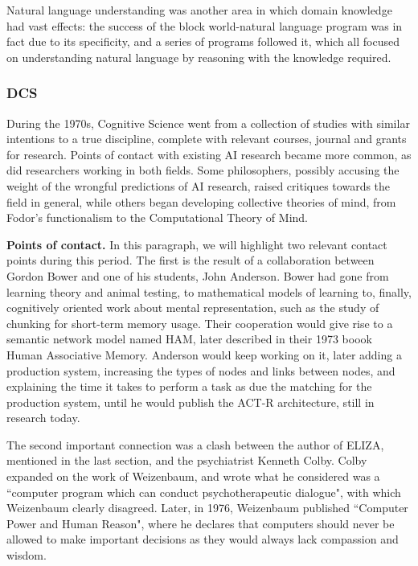 \documentclass[../main.tex]{subfiles}
\begin{document}
Natural language understanding was another area in which domain knowledge had vast effects: the success of the block world-natural language program was in fact due to its specificity, and a series of programs followed it\cite{schankScriptsPlansGoals1977}\cite{wilenskyUnderstandingGoalbasedStories1978}\cite{schankComputerUnderstanding1981}, which all focused on understanding natural language by reasoning with the knowledge required.

\subsubsection{DCS}
During the 1970s, Cognitive Science went from a collection of studies with similar intentions to a true discipline, complete with relevant courses, journal and grants for research. Points of contact with existing AI research became more common, as did researchers working in both fields. Some philosophers, possibly accusing the weight of the wrongful predictions of AI research, raised critiques towards the field in general, while others began developing collective theories of mind, from Fodor's functionalism to the Computational Theory of Mind.

\vspace{4pt}
\textbf{Points of contact.} In this paragraph, we will highlight two relevant contact points during this period. The first is the result of a collaboration between Gordon Bower and one of his students, John Anderson. Bower had gone from learning theory and animal testing, to mathematical models of learning to, finally, cognitively oriented work about mental representation, such as the study of chunking for short-term memory usage\cite{GordonBowerPsycNET}. Their cooperation would give rise to a semantic network model named HAM, later described in their 1973 boook Human Associative Memory\cite{andersonHumanAssociativeMemory1973}. Anderson would keep working on it, later adding a production system, increasing the types of nodes and links between nodes, and explaining the time it takes to perform a task as due the matching for the production system, until he would publish the ACT-R architecture, still in research today.

The second important connection was a clash between the author of ELIZA, mentioned in the last section, and the psychiatrist Kenneth Colby. Colby expanded on the work of Weizenbaum\cite{colbyComputerMethodPsychotherapy1966}, and wrote what he considered was a ``computer program which can conduct psychotherapeutic dialogue", with which Weizenbaum clearly disagreed. Later, in 1976, Weizenbaum published ``Computer Power and Human Reason"\cite{weizenbaumComputerPowerHuman1976}, where he declares that computers should never be allowed to make important decisions as they would always lack compassion and wisdom.
\end{document}
